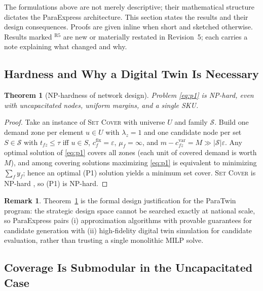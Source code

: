 \documentclass[10pt,twocolumn,letterpaper]{article}
\newtheorem{theorem}{Theorem}
\theoremstyle{definition}
\newtheorem{remark}{Remark}
\begin{document}
The formulations above are not merely descriptive; their mathematical structure dictates the ParaExpress architecture. This section states the results and their design consequences. Proofs are given inline when short and sketched otherwise. Results marked $^{\mathrm{R5}}$ are new or materially restated in Revision~5; each carries a note explaining what changed and why.

\subsection{Hardness and Why a Digital Twin Is Necessary}

\begin{theorem}[NP-hardness of network design]\label{thm:hardness}
Problem \eqref{eq:p1} is NP-hard, even with uncapacitated nodes, uniform margins, and a single SKU.
\end{theorem}
\begin{proof}
Take an instance of \textsc{Set Cover} with universe $U$ and family $\mathcal{S}$. Build one demand zone per element $u\in U$ with $\lambda_z=1$ and one candidate node per set $S\in\mathcal{S}$ with $t_{fz}\le\tau$ iff $u\in S$, $c^{\mathrm{fix}}_f=\varepsilon$, $\mu_f=\infty$, and $m-c^{\mathrm{var}}_{fz}=M\gg|\mathcal{S}|\varepsilon$. Any optimal solution of \eqref{eq:p1} covers all zones (each unit of covered demand is worth $M$), and among covering solutions maximizing \eqref{eq:p1} is equivalent to minimizing $\sum_fy_f$; hence an optimal (P1) solution yields a minimum set cover. \textsc{Set Cover} is NP-hard \cite{garey1979}, so (P1) is NP-hard.
\end{proof}

\begin{remark}
Theorem~\ref{thm:hardness} is the formal design justification for the ParaTwin program: the strategic design space cannot be searched exactly at national scale, so ParaExpress pairs (i) approximation algorithms with provable guarantees for candidate generation with (ii) high-fidelity digital twin simulation for candidate evaluation, rather than trusting a single monolithic MILP solve.
\end{remark}

\subsection{Coverage Is Submodular in the Uncapacitated Case}
\end{document}

